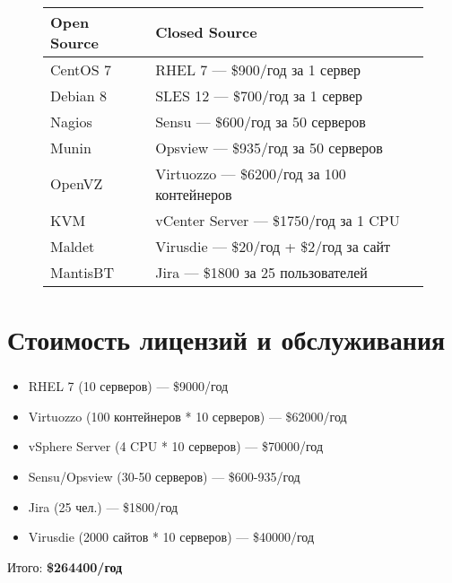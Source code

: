 \begin{frame}
\frametitle{\insertsection}
\begin{figure}[h]
	\begin{center}
		\begin{tabular}{|l|p{7.5cm}|}
			\hline
			\bf{Open Source} & \bf{Closed Source} \\ \hline
			CentOS 7 & RHEL 7 --- \$900/год за 1 сервер \\
			Debian 8 & SLES 12 --- \$700/год за 1 сервер \\ \hline
			Nagios & Sensu --- \$600/год за 50 серверов \\
			Munin & Opsview --- \$935/год за 50 серверов \\ \hline
			OpenVZ & Virtuozzo --- \$6200/год за 100 контейнеров \\
			KVM & vCenter Server --- \$1750/год за 1 CPU \\ \hline
			Maldet & Virusdie --- \$20/год + \$2/год за сайт \\
			MantisBT & Jira --- \$1800 за 25 пользователей \\
			\hline
		\end{tabular}
	\end{center}
\end{figure}
\end{frame}


\section{Стоимость лицензий и обслуживания}

\begin{frame}
\frametitle{\insertsection}
\begin{itemize}
	\item RHEL 7 (10 серверов) --- \$9000/год
	\item Virtuozzo (100 контейнеров * 10 серверов) --- \$62000/год
	\item vSphere Server (4 CPU * 10 серверов) --- \$70000/год
	\item Sensu/Opsview (30-50 серверов) --- \$600-935/год
	\item Jira (25 чел.) --- \$1800/год
	\item Virusdie (2000 сайтов * 10 серверов) --- \$40000/год
\end{itemize}
Итого: \bf{\$264400/год}
\end{frame}

